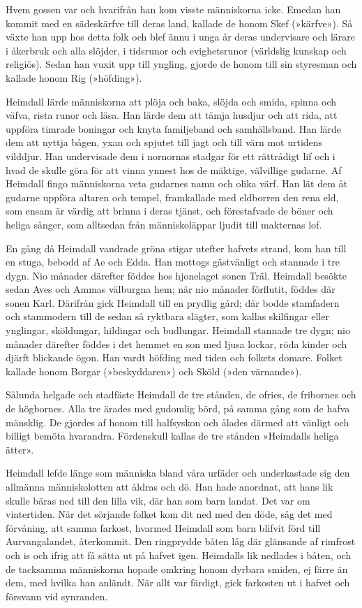 Hvem gossen var och hvarifrån han kom visste människorna icke. Emedan
han kommit med en sädeskärfve till deras land, kallade de honom Skef
(»kärfve»). Så växte han upp hos detta folk och blef ännu i unga år
deras undervisare och lärare i åkerbruk och alla slöjder, i tidsrunor
och evighetsrunor (världslig kunskap och religiös). Sedan han
vuxit upp till yngling, gjorde de honom till sin styresman och kallade
honom Rig (»höfding»).

Heimdall lärde människorna att plöja och baka, slöjda och smida, spinna
och väfva, rista runor och läsa. Han lärde dem att tämja husdjur och att
rida, att uppföra timrade boningar och knyta familjeband och
samhällsband. Han lärde dem att nyttja bågen, yxan och spjutet till jagt
och till värn mot urtidens vilddjur. Han undervisade dem i nornornas
stadgar för ett rättrådigt lif och i hvad de skulle göra för att vinna
ynnest hos de mäktige, välvillige gudarne. Af Heimdall fingo människorna
veta gudarnes namn och olika värf. Han lät dem åt gudarne uppföra
altaren och tempel, framkallade med eldborren den rena eld, som ensam är
värdig att brinna i deras tjänst, och förestafvade de böner och heliga
sånger, som alltsedan från människoläppar ljudit till makternas lof.

En gång då Heimdall vandrade gröna stigar utefter hafvets strand, kom
han till en stuga, bebodd af Ae och Edda. Han mottogs gästvänligt och
stannade i tre dygn. Nio månader därefter föddes hos hjonelaget sonen
Träl. Heimdall besökte sedan Aves och Ammas välburgna hem; när nio
månader förflutit, föddes där sonen Karl. Därifrån gick Heimdall till en
prydlig gård; där bodde stamfadern och stammodern till de sedan så
ryktbara slägter, som kallas skilfingar eller ynglingar, sköldungar,
hildingar och budlungar. Heimdall stannade tre dygn; nio månader
därefter föddes i det hemmet en son med ljusa lockar, röda kinder och
djärft blickande ögon. Han vardt höfding med tiden och folkets domare.
Folket kallade honom Borgar (»beskyddaren») och Sköld (»den värnande»).

Sålunda helgade och stadfäste Heimdall de tre stånden, de ofries, de
fribornes och de högbornes. Alla tre ärades med gudomlig börd, på samma
gång som de hafva mänsklig. De gjordes af honom till halfsyskon och
ålades därmed att vänligt och billigt bemöta hvarandra. Fördenskull
kallas de tre stånden »Heimdalls heliga ätter».

Heimdall lefde länge som människa bland våra urfäder och underkastade
sig den allmänna människolotten att åldras och dö. Han hade anordnat,
att hans lik skulle bäras ned till den lilla vik, där han som barn
landat. Det var om vintertiden. När det sörjande folket kom dit ned med
den döde, såg det med förvåning, att samma farkost, hvarmed Heimdall som
barn blifvit förd till Aurvangalandet, återkommit. Den ringprydde båten
låg där glänsande af rimfrost och is och ifrig att få sätta ut på hafvet
igen. Heimdalls lik nedlades i båten, och de tacksamma människorna
hopade omkring honom dyrbara smiden, ej färre än dem, med hvilka han
anländt. När allt var färdigt, gick farkosten ut i hafvet och försvann
vid synranden.

